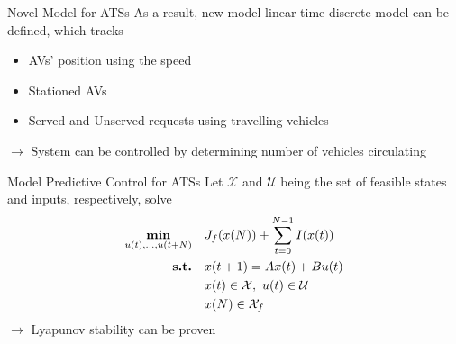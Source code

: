 \begin{frame}{Novel Model for ATSs}
	As a result, new model linear time-discrete model can be defined, which tracks
	\begin{itemize}
		\item AVs' position using the speed 
		\item Stationed AVs
		\item Served and Unserved requests using travelling vehicles
	\end{itemize}
	\vspace{0.3cm}
	$\rightarrow$ System can be controlled by determining number of vehicles circulating
\end{frame}


\begin{frame}{Model Predictive Control for ATSs}
	Let $\mathcal{X}$ and $\mathcal{U}$ being the set of feasible states and inputs, respectively, solve
	\begin{equation}
		\begin{aligned}
			\underset{\substack{u(t), \dots, u(t+N)}}{\text{\textbf{min}}} \quad & J_f(x(N))+\sum_{t=0}^{N-1}I(x(t)) \\
			\text{\textbf{s.t.}} \quad & x(t+1) = Ax(t) + Bu(t)  \\
			& x(t) \in \mathcal{X}, \ u(t)\in \mathcal{U} \\
			&x(N) \in \mathcal{X}_f\\
		\end{aligned}
	\end{equation}
	\vspace{0.7cm}
	$\rightarrow$ Lyapunov stability can be proven
\end{frame}
